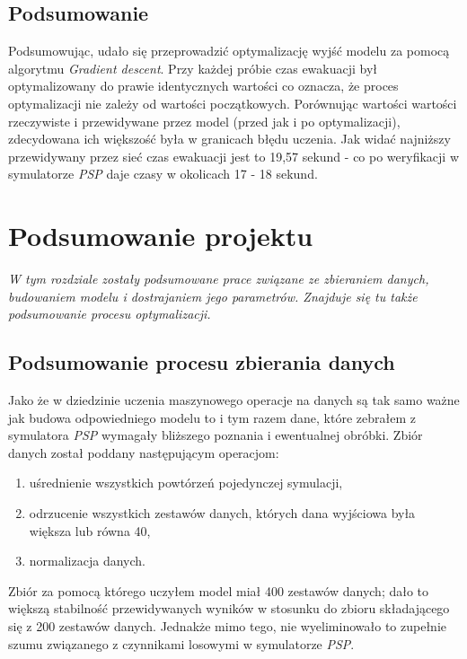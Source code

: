 \documentclass[12pt]{aghdpl}
\begin{document}
		\section{Podsumowanie}
		Podsumowując, udało się przeprowadzić optymalizację wyjść modelu za pomocą algorytmu \textit{Gradient descent}. Przy każdej próbie czas ewakuacji był optymalizowany do prawie identycznych wartości co oznacza, że proces optymalizacji nie zależy od wartości początkowych. Porównując wartości wartości rzeczywiste i przewidywane przez model (przed jak i po optymalizacji), zdecydowana ich większość była w granicach błędu uczenia. Jak widać najniższy przewidywany przez sieć czas ewakuacji jest to 19,57 sekund - co po weryfikacji w symulatorze \textit{PSP} daje czasy w okolicach 17 - 18 sekund.
		
	\chapter{Podsumowanie projektu}
	\textit{W tym rozdziale zostały podsumowane prace związane ze zbieraniem danych, budowaniem modelu i dostrajaniem jego parametrów. Znajduje się tu także podsumowanie procesu optymalizacji.}	
	
		\section{Podsumowanie procesu zbierania danych}
		Jako że w dziedzinie uczenia maszynowego operacje na danych są tak samo ważne jak budowa odpowiedniego modelu to i tym razem dane, które zebrałem z symulatora \textit{PSP} wymagały bliższego poznania i ewentualnej obróbki. Zbiór danych został poddany następującym operacjom:
		\begin{enumerate}
		\item uśrednienie wszystkich powtórzeń pojedynczej symulacji,
		\item odrzucenie wszystkich zestawów danych, których dana wyjściowa była większa lub równa 40,
		\item normalizacja danych.		
		\end{enumerate}
		
		Zbiór za pomocą którego uczyłem model miał 400 zestawów danych; dało to większą stabilność przewidywanych wyników w stosunku do zbioru składającego się z 200 zestawów danych. Jednakże mimo tego, nie wyeliminowało to zupełnie szumu związanego z czynnikami losowymi w symulatorze \textit{PSP}.
		
\end{document}
